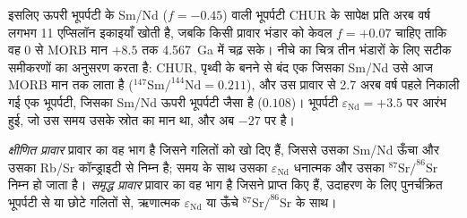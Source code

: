 इसलिए ऊपरी भूपर्पटी के Sm/Nd ($f = -0.45$) वाली भूपर्पटी CHUR के सापेक्ष प्रति अरब वर्ष लगभग
11 एप्सिलॉन इकाइयाँ खोती है, जबकि किसी प्रावार भंडार को केवल $f = +0.07$ चाहिए ताकि वह
0 से MORB मान $+8.5$ तक \qty{4.567}{Ga} में चढ़ सके। नीचे का चित्र तीन
भंडारों के लिए सटीक समीकरणों का अनुसरण करता है: CHUR, पृथ्वी के बनने से बंद एक 
जिसका Sm/Nd उसे आज MORB मान तक लाता है ($^{147}\mathrm{Sm}/^{144}\mathrm{Nd} =
0.211$), और उस प्रावार से 2.7 अरब वर्ष पहले निकाली गई एक भूपर्पटी, जिसका
Sm/Nd ऊपरी भूपर्पटी जैसा है ($0.108$)। भूपर्पटी $\varepsilon_{\mathrm{Nd}} =
+3.5$ पर आरंभ हुई, जो उस समय उसके स्रोत का मान था, और अब
$-27$ पर है।

\begin{definition}[क्षीणित प्रावार, समृद्ध प्रावार]\label{def:b2:isotope-geochemistry:reservoirs}
\emph{क्षीणित प्रावार} प्रावार का वह भाग है जिसने
 गलितों को खो दिए हैं, जिससे उसका Sm/Nd ऊँचा और उसका Rb/Sr
कॉन्ड्राइटी से निम्न है; समय के साथ उसका $\varepsilon_{\mathrm{Nd}}$ धनात्मक और
उसका $^{87}\mathrm{Sr}/^{86}\mathrm{Sr}$ निम्न हो जाता है। \emph{समृद्ध
प्रावार} प्रावार का वह भाग है जिसने  प्राप्त किए हैं,
उदाहरण के लिए पुनर्चक्रित भूपर्पटी से या छोटे गलितों से,
ऋणात्मक $\varepsilon_{\mathrm{Nd}}$ या ऊँचे $^{87}\mathrm{Sr}/^{86}\mathrm{Sr}$ के साथ।
\end{definition}

